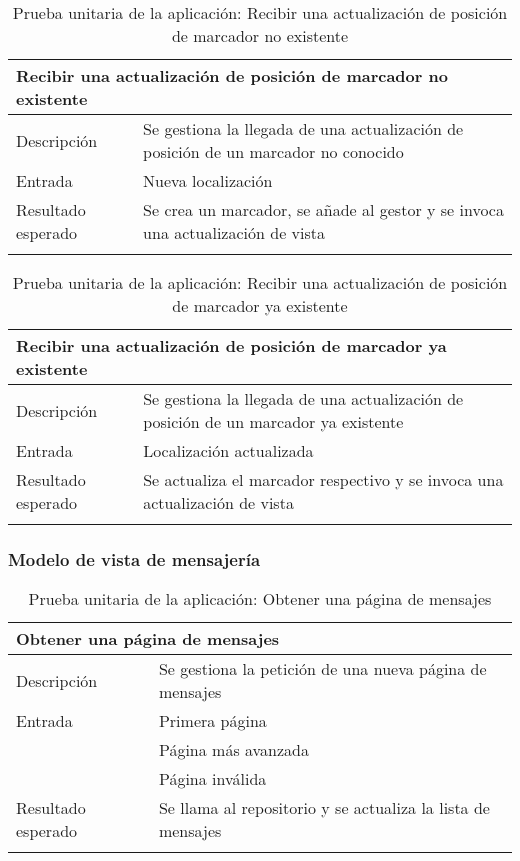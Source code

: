 \vspace{-10pt}
\begin{longtable}{|p{} p{}|}
    \hline
    \multicolumn{2}{|l|}{\textbf{Recibir una actualización de posición de marcador no existente}} \\ \hline 
    Descripción                 & Se gestiona la llegada de una actualización de posición de un marcador no conocido \\ \hline
    Entrada                     & Nueva localización \\ \hline
    Resultado esperado          & Se crea un marcador, se añade al gestor y se invoca una actualización de vista \\ \hline
    \caption{Prueba unitaria de la aplicación: Recibir una actualización de posición de marcador no existente}
    \label{cp:u:app:recibir_actualizacion_posicion_no_existente}
\end{longtable}

\begin{longtable}{|p{} p{}|}
    \hline
    \multicolumn{2}{|l|}{\textbf{Recibir una actualización de posición de marcador ya existente}} \\ \hline 
    Descripción                 & Se gestiona la llegada de una actualización de posición de un marcador ya existente \\ \hline
    Entrada                     & Localización actualizada \\ \hline
    Resultado esperado          & Se actualiza el marcador respectivo y se invoca una actualización de vista \\ \hline
    \caption{Prueba unitaria de la aplicación: Recibir una actualización de posición de marcador ya existente}
    \label{cp:u:app:recibir_actualizacion_posicion_marcador}
\end{longtable}
    
\subsubsection{Modelo de vista de mensajería}

\begin{longtable}{|p{} p{}|}
    \hline
    \multicolumn{2}{|l|}{\textbf{Obtener una página de mensajes}} \\ \hline 
    Descripción                 & Se gestiona la petición de una nueva página de mensajes \\ \hline
    Entrada                     & Primera página \\
                                & Página más avanzada \\
                                & Página inválida \\\hline
    Resultado esperado          & Se llama al repositorio y se actualiza la lista de mensajes \\ \hline
    \caption{Prueba unitaria de la aplicación: Obtener una página de mensajes}
    \label{cp:u:app:obtener_pagina_mensajes}
\end{longtable}

